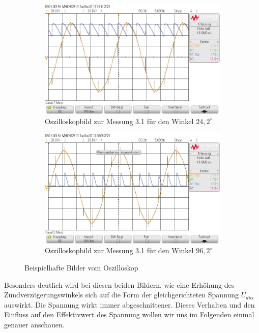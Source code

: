 \documentclass{article}
\begin{document}
\begin{figure}[h]
  \centering
  \begin{subfigure}{.45\textwidth}
    \centering
    \includegraphics[width=\linewidth]{../assets/images/GEP2/31_Winkel242.png}
    \caption{Oszilloskopbild zur Messung 3.1 für den Winkel $24,2^{\circ}$}
  \end{subfigure}
  \begin{subfigure}{.45\textwidth}
    \centering
    \includegraphics[width=\linewidth]{../assets/images/GEP2/31_Winkel962.png}
    \caption{Oszilloskopbild zur Messung 3.1 für den Winkel $96,2^{\circ}$}
  \end{subfigure}
  \label{fig:31_242}
  \caption{Beispielhafte Bilder vom Oszilloskop}
\end{figure}

Besonders deutlich wird bei diesen beiden Bildern, wie eine Erhöhung des Zündverzögerungswinkels sich auf die Form der gleichgerichteten Spannung $U_{di\alpha}$ auswirkt. Die Spannung wirkt immer abgeschnittener. Dieses Verhalten und den Einfluss auf den Effektivwert des Spannung wollen wir uns im Folgenden einmal genauer anschauen.
\end{document}
